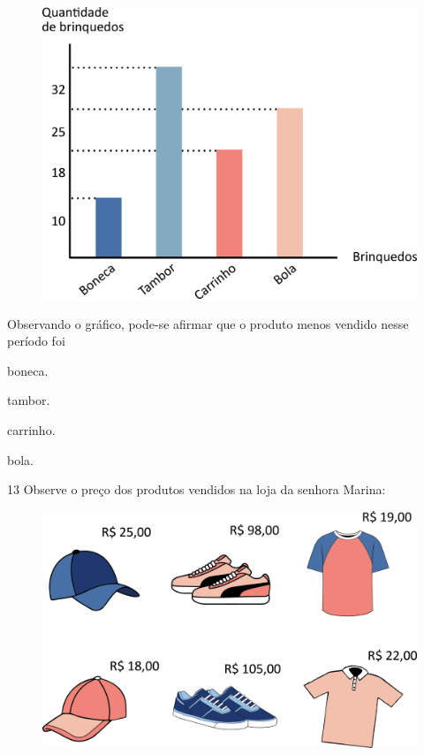 \begin{figure}[htpb!]
\centering
\includegraphics[width=\textwidth]{./media/image119.png}
\end{figure}

Observando o gráfico, pode-se afirmar que o produto menos vendido nesse período foi

\begin{escolha}
\item
  boneca.
\item
  tambor.
\item
  carrinho.
\item
  bola.
\end{escolha}

\pagebreak
\num{13} Observe o preço dos produtos vendidos na loja da senhora Marina:

\begin{figure}[htpb!]
\centering
\includegraphics[width=\textwidth]{./media/image120.png}
\end{figure}

